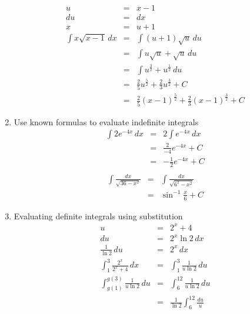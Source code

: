 \documentclass{article}
\begin{document}
\begin{enumerate}
        \begin{eqnarray}
            u &=& x - 1 \\
            du &=& dx \\
            x &=& u + 1 \\
            \int{x\sqrt{x - 1}\,dx} &=& \int{\left(u + 1\right)\sqrt{u}\,du} \\
                                    &=& \int{u\sqrt{u} + \sqrt{u}\,du} \\
                                    &=& \int{u^{\frac{3}{2}} + u^{\frac{1}{2}}\,du} \\
                                    &=& \frac{2}{5}u^{\frac{5}{2}} + \frac{2}{3}u^{\frac{3}{2}} + C \\
                                    &=& \frac{2}{5}\left(x - 1\right)^{\frac{5}{2}} + \frac{2}{3}\left(x - 1\right)^{\frac{3}{2}} + C
        \end{eqnarray}
    \item Use known formulas to evaluate indefinite integrals
        \begin{eqnarray}
            \int{2e^{-4x}\,dx} &=& 2\int{e^{-4x}\,dx} \\
                               &=& \frac{2}{-4}e^{-4x} + C \\
                               &=& -\frac{1}{2}e^{-4x} + C \\
        \end{eqnarray}
        \begin{eqnarray}
            \int{\frac{dx}{\sqrt{36 - x^2}}} &=& \int{\frac{dx}{\sqrt{6^2 - x^2}}} \\
                                             &=& \sin^{-1}{\frac{x}{6}} + C
        \end{eqnarray}
    \item Evaluating definite integrals using substitution
        \begin{eqnarray}
            u &=& 2^x + 4 \\
            du &=& 2^x\ln{2}\,dx \\
            \frac{1}{\ln{2}}\,du &=& 2^x\,dx \\
            \int_1^3{\frac{2^x}{2^x + 4}\,dx} &=& \int_1^3{\frac{1}{u\ln{2}}\,du} \\
            \int_{g(1)}^{g(3)}{\frac{1}{u\ln{2}}\,du} &=& \int_{6}^{12}{\frac{1}{u\ln{2}}\,du} \\
                                                      &=& \frac{1}{\ln{2}}\int_{6}^{12}{\frac{du}{u}} \\

\end{eqnarray}
\end{enumerate}
\end{document}
